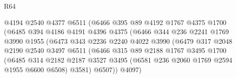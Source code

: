\begin{lexlean}{R64}
\begin{coremodule}
                                  @4194
                                  @2540
                                  @4377
                                  @6511
                                  (@6466
                                    @395
                                    @89
                                    @4192
                                    @1767
                                    @4375
                                    @1700
                                    (@6485
                                      @394
                                      @4186
                                      @4191
                                      @4396
                                      @4375
                                      (@6466
                                        @344
                                        @236
                                        @2241
                                        @1769
                                        @3990
                                        @1955
                                        (@6473
                                          @343
                                          @2236
                                          @2240
                                          @4022
                                          @3990
                                          (@6479
                                            @317
                                            @2048
                                            @2190
                                            @2540
                                            @3497
                                            @6511
                                            (@6466
                                              @315
                                              @89
                                              @2188
                                              @1767
                                              @3495
                                              @1700
                                              (@6485
                                                @314
                                                @2182
                                                @2187
                                                @3527
                                                @3495
                                                (@6581 @236 @2060 @1769 @2594 @1955 @6600 @6508)
                                                @3581)
                                              @6507))
                                          @4097)

\end{coremodule}
\end{lexlean}
